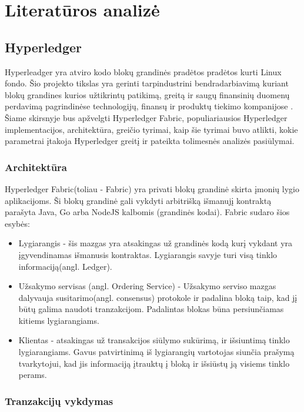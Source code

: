 \documentclass{VUMIFPSkursinis}
\begin{document}
\section{Literatūros analizė}
	\subsection{Hyperledger}
		Hyperleadger yra atviro kodo blokų grandinės pradėtos pradėtos kurti Linux fondo. Šio projekto tikslas yra gerinti tarpindustrini bendradarbiavimą kuriant blokų grandines kurios užtikrintų 
		patikimą, greitą ir saugų finansinių duomenų perdavimą pagrindinėse technologijų, finansų ir produktų tiekimo kompanijose \cite{LinuxHyper}. Šiame skirsnyje bus apžvelgti 
		Hyperledger Fabric, populiariausios Hyperledger implementacijos, architektūra, greičio tyrimai, kaip šie tyrimai buvo atlikti, kokie parametrai įtakoja Hyperledger greitį ir pateikta tolimesnės analizės pasiūlymai. 
		
		\subsubsection{Architektūra}
			Hyperledger Fabric(toliau - Fabric) yra privati blokų grandinė skirta įmonių lygio aplikacijoms. 
			Ši blokų grandinė gali vykdyti arbitrišką išmanujį kontraktą parašyta Java, Go arba NodeJS kalbomis (grandinės kodai).
			Fabric sudaro šios esybės:
			\begin{itemize}
				\item{Lygiarangis - šis mazgas yra atsakingas už grandinės kodą kurį vykdant yra įgyvendinamas išmanusis kontraktas. 
 Lygiarangis savyje turi visą tinklo informaciją(angl. Ledger). }
				\item{Užsakymo servisas (angl. Ordering Service) - Užsakymo serviso mazgas dalyvauja susitarimo(angl. consensus) 
protokole ir padalina bloką taip, kad jį būtų galima naudoti tranzakcijom. Padalintas blokas būna persiunčiamas kitiems lygiarangiams.}
				\item{Klientas - atsakingas už transakcijos siūlymo sukūrimą, ir išsiuntimą tinklo lygiarangiams. Gavus patvirtinimą iš lygiarangių vartotojas siunčia prašymą tvarkytojui, kad jis informaciją įtrauktų į bloką ir išsiūstų ją visiems tinklo perams.}
			\end{itemize}

		\subsubsection{Tranzakcijų vykdymas}
\end{document}
